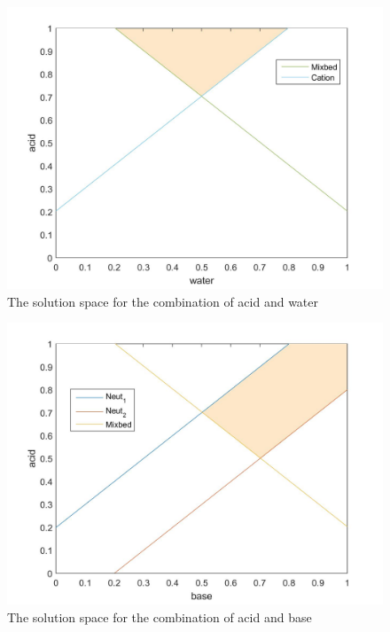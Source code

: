 \begin{figure}[h]
	\centering
	\includegraphics[width=0.7\linewidth]{img/reservationcurve_water_acid}
	\caption{The solution space for the combination of acid and water}
	\label{fig:reservationcurvewateracid}
\end{figure}
\begin{figure}[h]
	\centering
	\includegraphics[width=0.7\linewidth]{img/reservationcurve_base_acid}
	\caption{The solution space for the combination of acid and base}
	\label{fig:reservationcurvebaseacid}
\end{figure}




%



